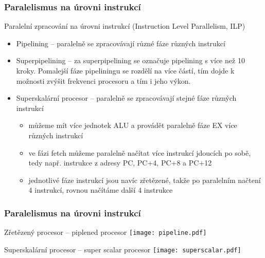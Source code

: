 \documentclass{beamer}
\begin{document}
\begin{frame}
\frametitle{Paralelismus na úrovni instrukcí}

Paralelní zpracování na úrovni instrukcí (Instruction Level Parallelism, ILP)
\begin{itemize}
 \item Pipelining -- paralelně se zpracovávají různé fáze různých instrukcí
 \item Superpipelining -- za superpipelining se označuje pipelining s více než 10 kroky. Pomalejší fáze pipeliningu se rozdělí na více částí, tím dojde k možnosti zvýšit frekvenci procesoru a tím i jeho výkon.
 \item Superskalární procesor -- paralelně se zpracovávají stejné fáze různých instrukcí
\begin{itemize}
\item můžeme mít více jednotek ALU a provádět paralelně fáze EX více různých instrukcí
\item ve fázi fetch můžeme paralelně načítat více instrukcí jdoucích po sobě, tedy např. instrukce z adresy PC, PC+4, PC+8 a PC+12
\item jednotlivé fáze instrukcí jsou navíc zřetězené, takže po paralelním načtení 4 instrukcí, rovnou načítáme další 4 instrukce 
\end{itemize}
\end{itemize}

\end{frame}

\begin{frame}
\frametitle{Paralelismus na úrovni instrukcí}

Zřetězený procesor -- piplened procesor
\texttt{[image: pipeline.pdf]}

Superskalární procesor -- super scalar procesor
\texttt{[image: superscalar.pdf]}

\end{frame}
\end{document}
